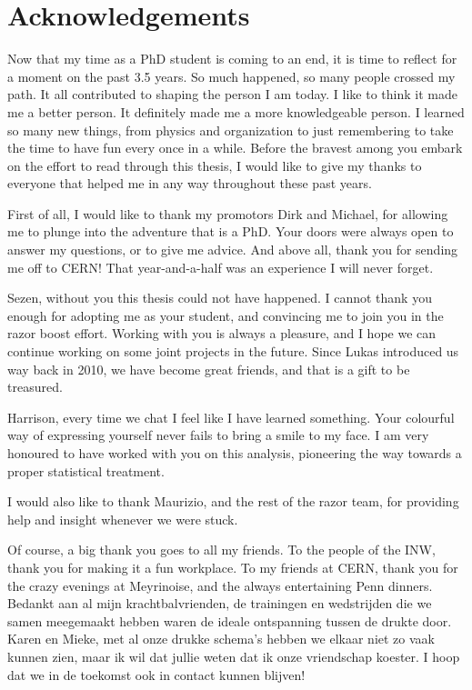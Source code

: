 \chapter*{Acknowledgements \label{sec:acknowledgements}}

Now that my time as a PhD student is coming to an end, it is time to reflect for a moment on the
past 3.5 years. So much happened, so many people crossed my path. It all contributed to shaping the
person I am today. I like to think it made me a better person. It definitely made me a more
knowledgeable person. 
I learned so many new things, from physics and organization to just remembering to take the time to
have fun every once in a while. 
Before the bravest among you embark on the effort to read through this thesis, I would like to give
my thanks to everyone that helped me in any way throughout these past years. 

First of all, I would like to thank my promotors Dirk and Michael, for allowing me to plunge into
the adventure that is a PhD. Your doors were always open to answer my questions, or to give me
advice. And above all, thank you for sending me off to CERN! That year-and-a-half was an
experience I will never forget. 

Sezen, without you this thesis could not have happened. I cannot thank you enough for adopting me
as your student, and convincing me to join you in the razor boost effort. Working with you is
always a pleasure, and I hope we can continue working on some joint projects in the future. Since
Lukas introduced us way back in 2010, we have become great friends, and that is a gift to be
treasured. 

Harrison, every time we chat I feel like I have learned something. Your colourful way of expressing
yourself never fails to bring a smile to my face. I am very honoured to have worked with you on
this analysis, pioneering the way towards a proper statistical treatment. 

I would also like to thank Maurizio, and the rest of the razor team, for providing help and insight
whenever we were stuck. 

Of course, a big thank you goes to all my friends. To the people of the INW, thank you for making
it a fun workplace. To my friends at CERN, thank you for the crazy evenings at Meyrinoise, and the
always entertaining Penn dinners. 
Bedankt aan al mijn krachtbalvrienden, de trainingen en wedstrijden die we samen meegemaakt hebben
waren de ideale ontspanning tussen de drukte door. 
Karen en Mieke, met al onze drukke schema's hebben we elkaar niet zo vaak kunnen zien, maar ik wil
dat jullie weten dat ik onze vriendschap koester. I hoop dat we in de toekomst ook in contact
kunnen blijven!


